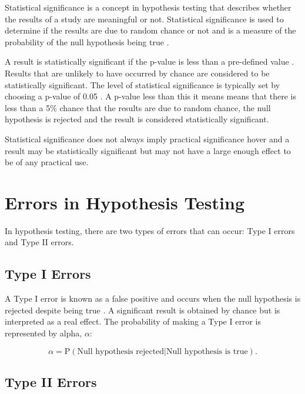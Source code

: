 \documentclass[
]{book}
\begin{document}
Statistical significance is a concept in hypothesis testing that describes whether the results of a study are meaningful or not. Statistical significance is used to determine if the results are due to random chance or not and is a measure of the probability of the null hypothesis being true \citep{tenny2}.

A result is statistically significant if the p-value is less than a pre-defined value \citep{tenny2}. Results that are unlikely to have occurred by chance are considered to be statistically significant. The level of statistical significance is typically set by choosing a p-value of 0.05 \citep{uncertainty}. A p-value less than this it means means that there is less than a 5\% chance that the results are due to random chance, the null hypothesis is rejected and the result is considered statistically significant.

Statistical significance does not always imply practical significance hover and a result may be statistically significant but may not have a large enough effect to be of any practical use.

\hypertarget{errors-in-hypothesis-testing}{%
\section{Errors in Hypothesis Testing}\label{errors-in-hypothesis-testing}}

In hypothesis testing, there are two types of errors that can occur: Type I errors and Type II errors.

\hypertarget{type-i-errors}{%
\subsection{Type I Errors}\label{type-i-errors}}

A Type I error is known as a false positive and occurs when the null hypothesis is rejected despite being true \citep{banerjee}. A significant result is obtained by chance but is interpreted as a real effect. The probability of making a Type I error is represented by alpha, \(\alpha\):

\[\alpha= \textrm{P}(\textrm{Null hypothesis rejected} | \textrm{Null hypothesis is true}).\]

\hypertarget{type-ii-errors}{%
\subsection{Type II Errors}\label{type-ii-errors}}
\end{document}
